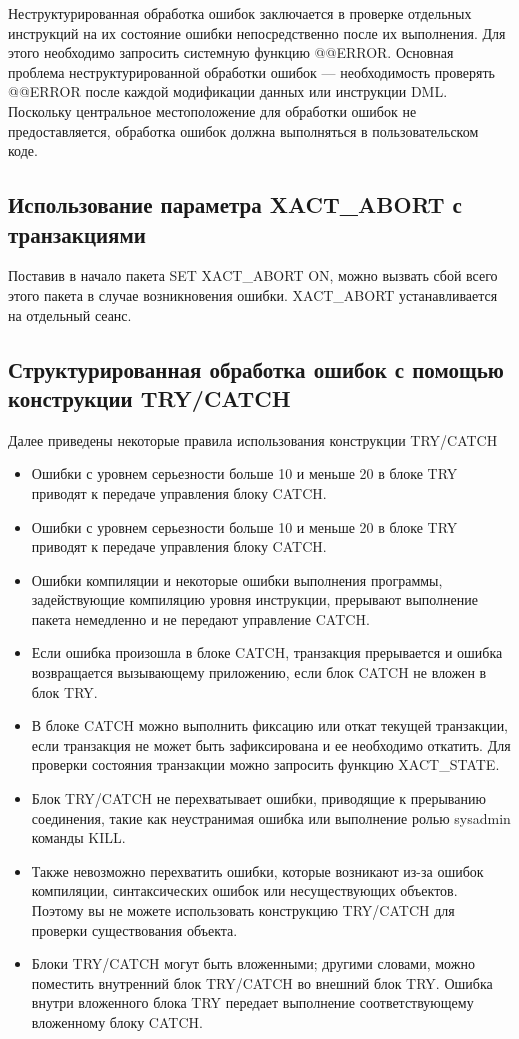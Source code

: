 Неструктурированная обработка ошибок заключается в проверке отдельных инструкций на их состояние ошибки непосредственно после их выполнения. Для этого
необходимо запросить системную функцию @@ERROR.
Основная проблема неструктурированной обработки ошибок — необходимость
проверять @@ERROR после каждой модификации данных или инструкции DML. Поскольку центральное местоположение для обработки ошибок не предоставляется,
обработка ошибок должна выполняться в пользовательском коде. 

\subsection{Использование параметра XACT\_ABORT с транзакциями}


Поставив в начало пакета SET XACT\_ABORT ON, можно вызвать сбой всего этого
пакета в случае возникновения ошибки. XACT\_ABORT устанавливается на отдельный
сеанс.

\subsection{Структурированная обработка ошибок с помощью конструкции TRY/CATCH}

Далее приведены некоторые правила использования конструкции TRY/CATCH

\begin{itemize}
	\item Ошибки с уровнем серьезности больше 10 и меньше 20 в блоке TRY приводят
	к передаче управления блоку CATCH. 
	\item Ошибки с уровнем серьезности больше 10 и меньше 20 в блоке TRY приводят
	к передаче управления блоку CATCH. 
	\item Ошибки компиляции и некоторые ошибки выполнения программы, задействующие компиляцию уровня инструкции, прерывают выполнение пакета немедленно и не передают управление CATCH. 
	\item Если ошибка произошла в блоке CATCH, транзакция прерывается и ошибка возвращается вызывающему приложению, если блок CATCH не вложен в блок TRY. 
	\item В блоке CATCH можно выполнить фиксацию или откат текущей транзакции, если транзакция не может быть зафиксирована и ее необходимо откатить. Для проверки состояния транзакции можно запросить функцию XACT\_STATE. 
	\item Блок TRY/CATCH не перехватывает ошибки, приводящие к прерыванию соединения, такие как неустранимая ошибка или выполнение ролью sysadmin команды KILL. 
	\item Также невозможно перехватить ошибки, которые возникают из-за ошибок компиляции, синтаксических ошибок или несуществующих объектов. Поэтому вы не можете использовать конструкцию TRY/CATCH для проверки существования объекта.
	\item Блоки TRY/CATCH могут быть вложенными; другими словами, можно поместить внутренний блок TRY/CATCH во внешний блок TRY. Ошибка внутри вложенного блока TRY передает выполнение соответствующему вложенному блоку CATCH. 
\end{itemize}

